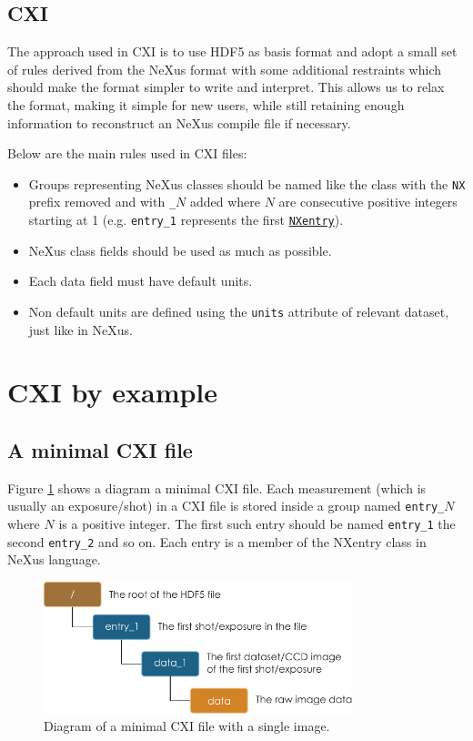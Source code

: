 \documentclass[usletter,11pt]{article}
\begin{document}
\subsection{CXI}

The approach used in CXI is to use HDF5 as basis format and adopt a small set of rules derived from the NeXus format with some additional restraints which should make the format simpler to write and interpret. This allows us to relax the format, making it simple for new users, while still retaining enough information to reconstruct an NeXus compile file if necessary.

Below are the main rules used in CXI files:
\begin{itemize}
\item{Groups representing NeXus classes should be named like the class
    with the {\tt NX} prefix removed and with {\tt \_$N$} added where
    $N$ are consecutive positive integers starting at 1
    (e.g. {\tt entry\_1} represents the first
    \hyperref[table:entry]{\tt NXentry}).}
\item{NeXus class fields should be used as much as possible.}
\item{Each data field must have default units.}
\item{Non default units are defined using the {\tt units} attribute of relevant dataset, just like in NeXus.} 
\end{itemize}

\section{CXI by example}
\subsection{A minimal CXI file}
Figure \ref{fig:minimal} shows a diagram a minimal CXI file. Each measurement (which is usually an exposure/shot) in a CXI file is stored inside a group named {\tt entry\_$N$} where $N$ is a positive integer. The first such entry should be named {\tt entry\_1} the second {\tt entry\_2} and so on. Each entry is a member of the NXentry class in NeXus language.

\begin{figure}[h!]
\centering
\includegraphics[width=0.8\textwidth]{minimal_cxi.pdf}
\caption{Diagram of a minimal CXI file with a single image.}
\label{fig:minimal}
\end{figure}
\end{document}
